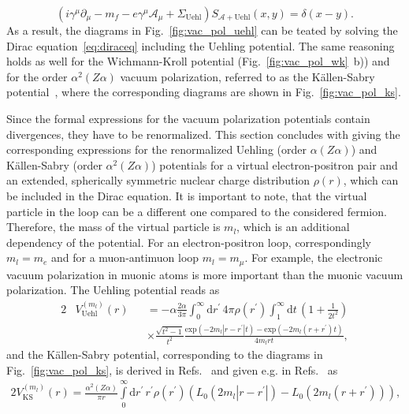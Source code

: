 \begin{equation}
\left(i\gamma^\mu \partial_\mu -m_f - e \gamma^\mu \mathcal{A}_\mu + \Sigma_{\text{Uehl}}\right)S_{\mathcal{A}+\text{Uehl}}(x,y)=\delta(x-y).
\label{eq:uehlprop}
\end{equation}
As a result, the diagrams in Fig.~\ref{fig:vac_pol_uehl} can be teated by solving the Dirac equation~\eqref{eq:diraceq} including the Uehling potential. The same reasoning holds as well for the Wichmann-Kroll potential (Fig.~\ref{fig:vac_pol_wk}~b)) and for the order $\alpha^2(Z\alpha)$ vacuum polarization, referred to as the Källen-Sabry potential~\cite{kallen1955}, where the corresponding diagrams are shown in Fig.~\ref{fig:vac_pol_ks}. 

Since the formal expressions for the vacuum polarization potentials contain divergences, they have to be renormalized. This section concludes with giving the corresponding expressions for the renormalized Uehling (order $\alpha(Z\alpha)$) and Källen-Sabry (order $\alpha^2(Z\alpha)$) potentials for a virtual electron-positron pair and an extended, spherically symmetric nuclear charge distribution $\rho(r)$, which can be included in the Dirac equation. It is important to note, that the virtual particle in the loop can be a different one compared to the considered fermion. Therefore, the mass of the virtual particle is $m_l$, which is an additional dependency of the potential. For an electron-positron loop, correspondingly $m_l=m_e$ and for a muon-antimuon loop $m_l=m_\mu$. For example, the electronic vacuum polarization in muonic atoms is more important than the muonic vacuum polarization. The Uehling potential reads as~\cite{Fullerton1976,Elizarov2005}
\begin{alignat}{2}
&V^{(m_l)}_{\text{Uehl}}(r)&&=-\alpha \frac{2\alpha}{3\pi}\int_0^\infty \text{d}r^{\prime}\,4\pi \rho(r^\prime)\int_1^\infty \text{d}t\,\left( 1+\frac{1}{2t^2} \right)\nonumber\\[7.5pt]
&&&\times\frac{\sqrt{t^2-1}}{t^2} \frac{\text{exp}(-2m_l|r-r^\prime|t)-\text{exp}(-2m_l(r+r^\prime)t)}{4m_lr t},
\label{eq:uehlPot}
\end{alignat}
and the Källen-Sabry potential, corresponding to the diagrams in Fig.~\ref{fig:vac_pol_ks}, is derived in Refs.~\cite{Barbieri1970,Barbieri1972,Barbieri1972_2,Barbieri1973} and given e.g. in Refs.~\cite{indelicato2013,Fullerton1976} as
\begin{alignat}{2}
V^{(m_l)}_{\text{KS}}(r)=\frac{\alpha^2(Z\alpha)}{\pi r}\int\limits_0^\infty\text{d}r^\prime\,r^\prime \rho(r^\prime)\left( L_0(2m_l|r-r^\prime|)-L_0(2m_l(r+r^\prime))\right),\label{eq:KSPot}
\end{alignat}
